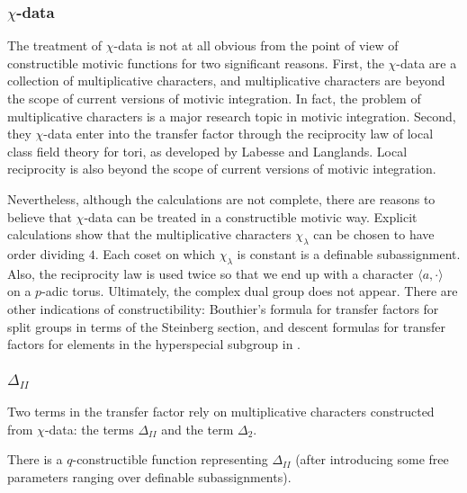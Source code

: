 \subsubsection{$\chi$-data}



The treatment of $\chi$-data is not at all obvious from the point of view of constructible motivic functions for two significant reasons.
First, the $\chi$-data are a collection of multiplicative characters, and multiplicative characters are beyond the scope of current versions of motivic integration.
In fact, the problem of multiplicative characters is a major research topic in motivic integration.
Second, they $\chi$-data enter into the transfer factor through the reciprocity law of local class field theory for tori, as developed by Labesse and Langlands.
Local reciprocity is also beyond the scope of current versions of motivic integration.

Nevertheless, although the calculations are not complete, there are reasons to believe that $\chi$-data can be treated in a constructible motivic way.
Explicit calculations show that the multiplicative characters $\chi_\lambda$ can be chosen to have order dividing $4$.  Each coset on which $\chi_\lambda$ is
constant is a definable subassignment.  Also, the reciprocity law is used twice so that we end up with a character $\langle a,\cdot\rangle$ on a $p$-adic torus.
Ultimately, the complex dual group does not appear.  
There are other indications of constructibility: Bouthier's formula for transfer factors for split groups in terms of the Steinberg section, 
and descent formulas for transfer factors for elements in the hyperspecial subgroup in \cite{hales1993simple}.

\subsubsection{$\Delta_{II}$}
Two terms in the transfer factor rely on multiplicative characters constructed from $\chi$-data: the terms $\Delta_{II}$ and the term $\Delta_2$.

\begin{lemma}  There is a $q$-constructible function representing $\Delta_{II}$ (after introducing some free parameters ranging over definable subassignments).
\end{lemma}

